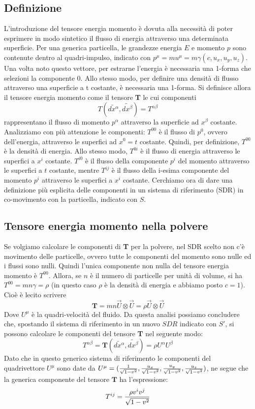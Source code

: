 \documentclass[]{report}
\theoremstyle{definition}
\theoremstyle{Theorem}
\theoremstyle{definition}
\theoremstyle{definition}
\theoremstyle{definition}
\begin{document}
\subsection{Definizione}
L'introduzione del tensore energia momento è dovuta alla necessità di poter esprimere in modo sintetico il flusso di energia attraverso una determinata superficie.
Per una generica particella, le grandezze energia $E$ e momento $p$ sono contenute dentro al quadri-impulso, indicato con $p^\mu=mu^\mu=m\gamma(c,u_x,u_y,u_z)$. Una volta noto questo vettore, per estrarne l'energia è necessaria una 1-forma che selezioni la componente 0. Allo stesso modo, per definire una densità di flusso attraverso una superficie a t costante, è necessaria una 1-forma. Si definisce allora il tensore energia momento come il tensore \textbf{T} le cui componenti
$$T(\tilde{dx^\alpha},\tilde{dx^\beta})=T^{\alpha\beta}$$
rappresentano il flusso di momento $p^\alpha$ attraverso la superficie ad $x^\beta$ costante.\\
Analizziamo con più attenzione le componenti:
$T^{00}$ è il flusso di $p^0$, ovvero dell'energia, attraverso le superfici ad $x^0=t$ costante. Quindi, per definizione, $T^{00}$ è la densità di energia.
Allo stesso modo, $T^{0i}$ è il flusso di energia attraverso le superfici a $x^i$ costante.
$T^{i0}$ è il flusso della componente $p^i$ del momento attraverso le superfici a $t$ costante, mentre $T^{ij}$ è il flusso della i-esima componente del momento $p^i$ attraverso le superfici a $x^i$ costante.
Cerchiamo ora di dare una definizione più esplicita delle componenti in un sistema di riferimento (SDR) in co-movimento con la particella, indicato con $S$.
\subsection{Tensore energia momento nella polvere}
Se volgiamo calcolare le componenti di \textbf{T} per la polvere, nel SDR scelto non c'è movimento delle particelle, ovvero tutte le componenti del momento sono nulle ed i flussi sono nulli. Quindi l'unica componente non nulla del tensore energia momento è $T^{00}$. Allora, se $n$ è il numero di particelle per unità di volume, si ha $T^{00}=mn\gamma=\rho$ (in questo caso $\rho$ è la densità di energia e abbiamo posto $c=1$). \\
Cioè è lecito scrivere
$$\textbf{T}=mn\vec{U}\otimes\vec{U}=\rho\vec{U}\otimes\vec{U}$$
Dove $U^\mu$ è la quadri-velocità del fluido.
Da questa analisi possiamo concludere che, spostando il sistema di riferimento in un nuovo $SDR$ indicato con $S'$, si possono calcolare le componenti del tensore \textbf{T} nel seguente modo:
$$T^{\alpha\beta}=\textbf{T}(\tilde{dx^\alpha},\tilde{dx^\beta})=\rho U^\alpha U^\beta$$
Dato che in questo generico sistema di riferimento le componenti del quadrivettore $U^\mu$ sono date da $U^\mu=({1\over\sqrt{1-v^2}},{u_x\over\sqrt{1-v^2}},{u_y\over\sqrt{1-v^2}},{u_z\over\sqrt{1-v^2}})$, ne segue che la generica componente del tensore $\textbf{T}$ ha l'espressione:
$$T^{ij}={\rho v^iv^j\over \sqrt{1-v^2}}$$
\end{document}
